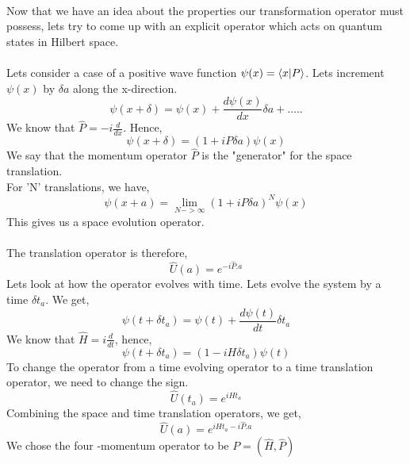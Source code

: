 \\
Now that we have an idea about the properties our transformation operator must possess, lets try to come up with an explicit operator which acts on quantum states in Hilbert space. \\
\\
Lets consider a case of a positive wave function $\psi(x)= \bra{x}\ket{P}$. Lets increment $\psi(x)$ by $\delta a$ along the x-direction. 
\begin{equation}
    \psi(x+\delta ) = \psi(x) + \frac{d \psi(x)}{d x} \delta a + .....
\end{equation}
We know that $\hat{P}=-i \frac{d}{dx}$. Hence, 
\begin{equation}
    \psi(x+\delta ) = (1+ iP \delta a) \psi (x)
\end{equation}
We say that the momentum operator $\hat{P}$ is the "generator" for the space
translation. \\
For 'N' translations, we have, 
\begin{equation}
    \psi(x+a) = \lim_{N -> \infty} (1+ iP \delta a)^{N} \psi (x)
\end{equation}
This gives us a space evolution operator.  \\
\\
The translation operator is therefore, 
\begin{equation}
    \hat{U}(a) = e^{-i\hat{P} . a}
\end{equation}
Lets look at how the operator evolves with time. Lets evolve the system by a time $\delta t_{a}$. We get, 
\begin{equation}
\psi(t+\delta t_{a}) = \psi (t) + \frac{d \psi(t)}{d t} \delta t_{a}
\end{equation}
We know that $\hat{H} = i \frac{d}{dt}$, hence, 
\begin{equation}
    \psi(t+\delta t_{a}) = (1- iH \delta t_{a}) \psi (t)
\end{equation}
To change the operator from a time evolving operator to a time translation operator, we need to change the sign. 
\begin{equation}
    \hat{U}(t_{a}) = e^{iHt_{a}}
\end{equation}
Combining the space and time translation operators, we get, 
\begin{equation}
    \hat{U}(a) = e^{ iHt_{a} -i\hat{P} . a}
\end{equation}
We chose the four -momentum operator to be $P=(\hat{H},\hat{P})$
